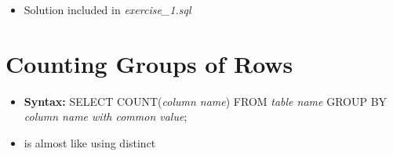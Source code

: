 \documentclass[12pt]{article}
\begin{document}
\begin{itemize}
    \item Solution included in \textit{exercise\_1.sql}
\end{itemize}

\bigskip

\section{Counting Groups of Rows}

\bigskip

\begin{itemize}
    \item \textbf{Syntax:} SELECT COUNT(\textit{column name}) FROM \textit{table name} GROUP BY \textit{column name with common value};
    \item is almost like using distinct
\end{itemize}
\end{document}
